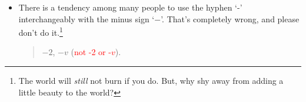 \begin{itemize}
\item There is a tendency among many people to use the hyphen `-' interchangeably with the minus sign `$-$'. That's completely wrong, and please don't do it.\footnote{The world will {\em still} not burn if you do. But, why shy away from adding a little beauty to the world?}
\begin{quote}
$-2$, $-v$ \quad (\textcolor{red}{not -2 or -$v$}). 
\end{quote}


\begin{comment}
\item When writing negative numbers, there should not be any gap between the `$-$' sign and the number/variable. For example:
\begin{quote}
$-2$ \quad (\textcolor{red}{not $-$ $2$}). 
\end{quote}
\end{comment}


\end{itemize}

